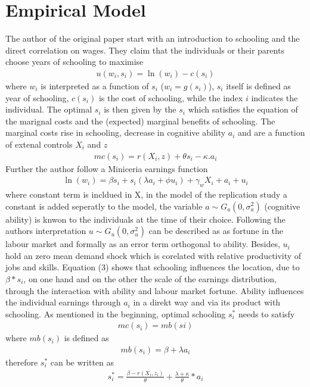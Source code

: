 \documentclass[12pt,a4paper]{article}
\begin{document}
\hypertarget{empirical-model}{%
\section{Empirical Model}\label{empirical-model}}

The author of the original paper start with an introduction to schooling
and the direct correlation on wages. They claim that the individuals or
their parents choose years of schooling to maximise
\begin{align}u\left(w_{i}, s_{i}\right)=\ln \left(w_{i}\right)-c\left(s_{i}\right)\end{align}
where \(w_i\) is interpreted as a function of \(s_i\)
(\(w_i = g(s_i)\)), \(s_i\) itself is defined as year of schooling,
\(c(s_i)\) is the cost of schooling, while the index \(i\) indicates the
individual. The optimal \(s_i\) is then given by the \(s_i\) which
satisfies the equation of the marignal costs and the (expected) marginal
benefits of schooling. The marginal costs rise in schooling, decrease in
cognitive ability \(a_i\) and are a function of extenal controls \(X_i\)
and \(z\)
\begin{align} mc\left(s_{i}\right)=r\left(X_{i}, z\right)+\theta s_{i}-\kappa .
a_{i}\end{align} Further the author follow a Miniceria earnings function
\begin{align}\ln\left(w_{i}\right)=\beta s_{i}+s_{i}\left(\lambda a_{i}+\phi u_{i}\right)+\gamma_{w} X_{i}+a_{i}+u_{i}\end{align}
where constant term is incldued in X, in the model of the replication
study a constant is added seperatly to the model, the variable
\(a \sim G_a(0,\sigma^2_a)\) (cognitive ability) is knwon to the
individuals at the time of their choice. Following the authors
interpretation \(u \sim G_u(0,\sigma^2_u)\) can be described as as
fortune in the labour market and formally as an error term orthogonal to
ability. Besides, \(u_i\) hold an zero mean demand shock which is
corelated with relative productivity of jobs and skills. Equation (3)
shows that schooling influences the location, due to \(\beta*s_i\), on
one hand and on the other the scale of the earnings distribution,
through the interaction with ability and labour market fortune. Ability
influences the individual earnings through \(a_i\) in a direkt way and
via its product with schooling. As mentioned in the beginning, optimal
schooling \(s_i^*\) needs to satisfy
\begin{align}mc(s_i) = mb(si)\end{align} where \(mb(s_i)\) is defined as
\begin{align} mb(s_i)= \beta + \lambda a_i \end{align} therefore
\(s_i^*\) can be written as
\begin{align} s_i^* = \frac{\beta - r(X_i, z_i)}{\theta} + \frac{\lambda  + \kappa}{\theta}*a_i \end{align}
\end{document}
